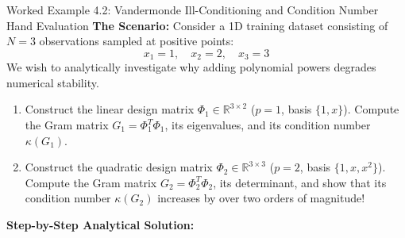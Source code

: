 \begin{examplebox}{Worked Example 4.2: Vandermonde Ill-Conditioning and Condition Number Hand Evaluation}
\label{ex:w04_vander_conditioning}
\textbf{The Scenario:}
Consider a 1D training dataset consisting of $N = 3$ observations sampled at positive points:
\begin{equation*}
x_1 = 1, \quad x_2 = 2, \quad x_3 = 3
\end{equation*}
We wish to analytically investigate why adding polynomial powers degrades numerical stability.
\begin{enumerate}
    \item Construct the linear design matrix $\Phi_1 \in \mathbb{R}^{3 \times 2}$ ($p = 1$, basis $\{1, x\}$). Compute the Gram matrix $G_1 = \Phi_1^T \Phi_1$, its eigenvalues, and its condition number $\kappa(G_1)$.
    \item Construct the quadratic design matrix $\Phi_2 \in \mathbb{R}^{3 \times 3}$ ($p = 2$, basis $\{1, x, x^2\}$). Compute the Gram matrix $G_2 = \Phi_2^T \Phi_2$, its determinant, and show that its condition number $\kappa(G_2)$ increases by over two orders of magnitude!
\end{enumerate}

\tcblower
\textbf{Step-by-Step Analytical Solution:}


\end{examplebox}

